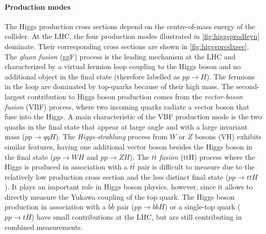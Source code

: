 \paragraph{Production modes} The Higgs production cross sections depend on the centre-of-mass energy of the collider.
At the LHC, the four production modes illustrated in \cref{fig:higgsprodfeyn} dominate.
Their corresponding cross sections are shown in \cref{fig:higgsprodxsec}.
The \emph{gluon fusion} (ggF) process is the leading mechanism at the LHC and characterized by a virtual fermion loop coupling to the Higgs boson and no additional object in the final state (therefore labelled as $pp\rightarrow H$). 
The fermions in the loop are dominated by top-quarks because of their high mass. 
The second-largest contribution to Higgs boson production comes from the \emph{vector-boson fusion} (VBF) process, where two incoming quarks radiate a vector boson that fuse into the Higgs.
A main characteristic of the VBF production mode is the two quarks in the final state that appear at large angle and with a large invariant mass ($pp\rightarrow qqH$).
The \emph{Higgs-strahlung} process from $W$ or $Z$ bosons (VH) exhibits similar features, having one additional vector boson besides the Higgs boson in the final state ($pp \rightarrow WH$ and $pp \rightarrow ZH$).
The $t\bar{t}$ \emph{fusion} (ttH) process where the Higgs is produced in association with a $t\bar{t}$ pair is difficult to measure due to the relatively low production cross section and the less distinct final state ($pp \rightarrow ttH$). It plays an important role in Higgs boson physics, however, since it allows to directly measure the Yukawa coupling of the top quark. 
The Higgs boson production in association with a $b\bar{b}$ pair ($pp\rightarrow bbH$) or a single-top quark ($pp \rightarrow tH$) have small contributions at the LHC, but are still contributing in combined measurements.

